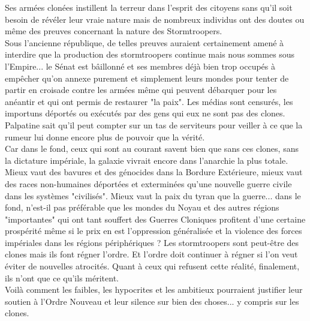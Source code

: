 \documentclass[twoside]{article}
\begin{document}
Ses armées clonées instillent la terreur dans l'esprit des citoyens sans qu'il soit besoin de révéler leur vraie nature mais de nombreux individus ont des doutes ou même des preuves concernant la nature des Stormtroopers.\\

Sous l'ancienne république, de telles preuves auraient certainement amené à interdire que la production des stormtroopers continue mais nous sommes sous l'Empire... le Sénat est bâillonné et ses membres déjà bien trop occupés à empêcher qu'on annexe purement et simplement leurs mondes pour tenter de partir en croisade contre les armées même qui peuvent débarquer pour les anéantir et qui ont permis de restaurer "la paix". Les médias sont censurés, les importuns déportés ou exécutés par des gens qui eux ne sont pas des clones. Palpatine sait qu'il peut compter sur un tas de serviteurs  pour veiller à ce que la rumeur lui donne encore plus de pouvoir que la vérité.\\

Car dans le fond, ceux qui sont au courant savent bien que sans ces clones, sans la dictature impériale, la galaxie vivrait encore dans l'anarchie la plus totale. Mieux vaut des bavures et des génocides dans la Bordure Extérieure, mieux vaut des races non-humaines déportées et exterminées qu'une nouvelle guerre civile dans les systèmes "civilisés". Mieux vaut la paix du tyran que la guerre... dans le fond, n'est-il pas préférable que les mondes du Noyau et des autres régions "importantes" qui ont tant souffert des Guerres Cloniques profitent d'une certaine prospérité même si le prix en est l'oppression généralisée et la violence des forces impériales dans les régions périphériques ?  Les stormtroopers sont peut-être des clones mais ils font régner l'ordre. Et l'ordre doit continuer à régner si l'on veut éviter de nouvelles atrocités. Quant à ceux qui refusent cette réalité, finalement, ils n'ont que ce qu'ils méritent.\\

Voilà comment les faibles, les hypocrites et les ambitieux pourraient justifier leur soutien à l'Ordre Nouveau et leur silence sur bien des choses... y compris sur les clones.
\end{document}
